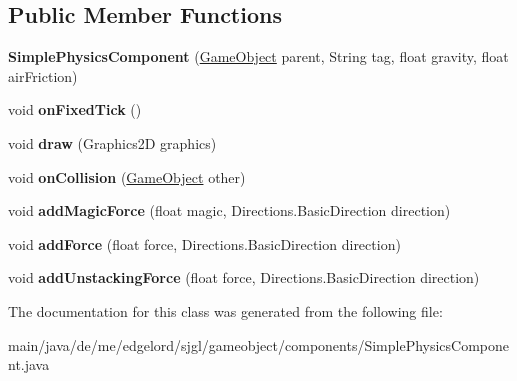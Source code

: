 \subsection*{Public Member Functions}
\begin{DoxyCompactItemize}
\item 
\mbox{\label{classde_1_1me_1_1edgelord_1_1sjgl_1_1gameobject_1_1components_1_1_simple_physics_component_ab85332de482799c92f6c8587f79699fd}} 
{\bfseries Simple\+Physics\+Component} (\mbox{\hyperlink{classde_1_1me_1_1edgelord_1_1sjgl_1_1gameobject_1_1_game_object}{Game\+Object}} parent, String tag, float gravity, float air\+Friction)
\item 
\mbox{\label{classde_1_1me_1_1edgelord_1_1sjgl_1_1gameobject_1_1components_1_1_simple_physics_component_a7ad66f245f7af4c5d3c40d1539dca2d2}} 
void {\bfseries on\+Fixed\+Tick} ()
\item 
\mbox{\label{classde_1_1me_1_1edgelord_1_1sjgl_1_1gameobject_1_1components_1_1_simple_physics_component_a9d32336e18ee38fa5cae80e593681d49}} 
void {\bfseries draw} (Graphics2D graphics)
\item 
\mbox{\label{classde_1_1me_1_1edgelord_1_1sjgl_1_1gameobject_1_1components_1_1_simple_physics_component_ab76fef5130dab84e12add27eabc28aab}} 
void {\bfseries on\+Collision} (\mbox{\hyperlink{classde_1_1me_1_1edgelord_1_1sjgl_1_1gameobject_1_1_game_object}{Game\+Object}} other)
\item 
\mbox{\label{classde_1_1me_1_1edgelord_1_1sjgl_1_1gameobject_1_1components_1_1_simple_physics_component_a297d4683154a82512025dc31f4ad5018}} 
void {\bfseries add\+Magic\+Force} (float magic, Directions.\+Basic\+Direction direction)
\item 
\mbox{\label{classde_1_1me_1_1edgelord_1_1sjgl_1_1gameobject_1_1components_1_1_simple_physics_component_a3e354915fa16a1040669dc55a49bb81b}} 
void {\bfseries add\+Force} (float force, Directions.\+Basic\+Direction direction)
\item 
\mbox{\label{classde_1_1me_1_1edgelord_1_1sjgl_1_1gameobject_1_1components_1_1_simple_physics_component_ab708550c42d6158854db1884ab68baff}} 
void {\bfseries add\+Unstacking\+Force} (float force, Directions.\+Basic\+Direction direction)
\end{DoxyCompactItemize}


The documentation for this class was generated from the following file\+:\begin{DoxyCompactItemize}
\item 
main/java/de/me/edgelord/sjgl/gameobject/components/Simple\+Physics\+Component.\+java\end{DoxyCompactItemize}
